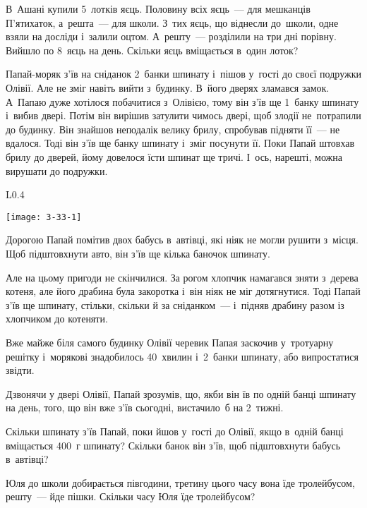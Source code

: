 \problem
В~Ашані купили 5~лотків яєць.
Половину всіх яєць~--- для мешканців П'ятихаток, а~решта~--- для школи.
З~тих яєць, що віднесли до~школи, одне взяли на досліди і~залили оцтом.
А~решту~--- розділили на три дні порівну. Вийшло по 8~яєць на день.
Скільки яєць вміщається в~один лоток? 


\problem
Папай-моряк з’їв на сніданок 2~банки шпинату і~пішов у~гості до своєї
подружки Олівії. Але не зміг навіть вийти з~будинку. В~його дверях
зламався замок. А~Папаю дуже хотілося побачитися з~Олівією, тому він
з’їв ще 1~банку шпинату і~вибив двері. Потім він вирішив затулити
чимось двері, щоб злодії не~потрапили до будинку. Він знайшов неподалік
велику брилу, спробував підняти її~--- не вдалося. Тоді він з’їв ще банку
шпинату і~зміг посунути її. Поки Папай штовхав брилу до дверей, йому
довелося їсти шпинат ще тричі. І~ось, нарешті, можна вирушати до подружки.

\begin{wrapfigure}{L}{0.4\textwidth}
  \vspace{-15pt}
  \begin{center}
    \texttt{[image: 3-33-1]}
  \end{center}
  \vspace{-15pt}
\end{wrapfigure}

Дорогою Папай помітив двох бабусь в~автівці, які ніяк не могли рушити
з~місця. Щоб підштовхнути авто, він з’їв ще кілька баночок шпинату.

Але на цьому пригоди не скінчилися. За рогом хлопчик намагався зняти
з~дерева котеня, але його драбина була закоротка і~він ніяк не міг
дотягнутися. Тоді Папай з’їв ще шпинату, стільки, скільки й
за сніданком~--- і~підняв драбину разом із хлопчиком до котеняти.

Вже майже біля самого будинку Олівії черевик Папая заскочив у~тротуарну
решітку і~морякові знадобилось 40~хвилин і~2~банки шпинату,
або випростатися звідти.

Дзвонячи у двері Олівії, Папай зрозумів, що, якби він їв по одній
банці шпинату на день, того, що він вже з’їв сьогодні,
вистачило~б на 2~тижні.

Скільки шпинату з’їв Папай, поки йшов у~гості до Олівії, якщо в~одній
банці вміщається 400~г шпинату?
Скільки банок він з’їв, щоб підштовхнути бабусь в~автівці?


\problem
Юля до школи добирається півгодини,
третину цього часу вона їде тролейбусом, решту~--- йде пішки.
Скільки часу Юля їде тролейбусом?


